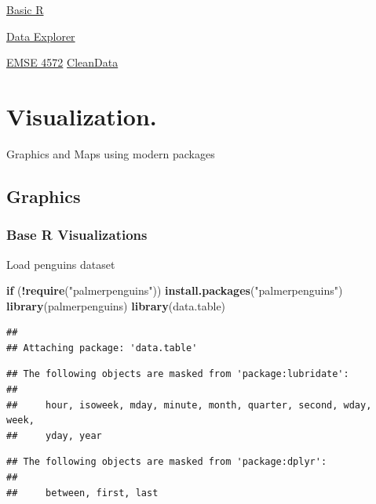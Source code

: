 \documentclass[
]{book}
\newenvironment{Shaded}{\begin{snugshade}}{\end{snugshade}}
\newcommand{\ControlFlowTok}[1]{\textcolor[rgb]{0.13,0.29,0.53}{\textbf{#1}}}
\newcommand{\FunctionTok}[1]{\textcolor[rgb]{0.13,0.29,0.53}{\textbf{#1}}}
\newcommand{\NormalTok}[1]{#1}
\newcommand{\SpecialCharTok}[1]{\textcolor[rgb]{0.81,0.36,0.00}{\textbf{#1}}}
\newcommand{\StringTok}[1]{\textcolor[rgb]{0.31,0.60,0.02}{#1}}
\begin{document}
\href{https://psyteachr.github.io/introdataviz/introduction.html}{Basic R}

\href{https://cran.r-project.org/web/packages/DataExplorer/vignettes/dataexplorer-intro.html}{Data Explorer}

\href{https://eda.seas.gwu.edu/2022-Fall/class/1-getting-started.html}{EMSE 4572}
\href{https://www.jumpingrivers.com/blog/best-practices-data-cleaning-r/}{CleanData}

\hypertarget{visualization.}{%
\chapter{Visualization.}\label{visualization.}}

Graphics and Maps using modern packages

\hypertarget{graphics}{%
\section{Graphics}\label{graphics}}

\hypertarget{base-r-visualizations}{%
\subsection{Base R Visualizations}\label{base-r-visualizations}}

Load penguins dataset

\begin{Shaded}
\begin{Highlighting}[]
\ControlFlowTok{if}\NormalTok{ (}\SpecialCharTok{!}\FunctionTok{require}\NormalTok{(}\StringTok{"palmerpenguins"}\NormalTok{)) }\FunctionTok{install.packages}\NormalTok{(}\StringTok{"palmerpenguins"}\NormalTok{)}
\FunctionTok{library}\NormalTok{(palmerpenguins)}
\FunctionTok{library}\NormalTok{(data.table)}
\end{Highlighting}
\end{Shaded}

\begin{verbatim}
## 
## Attaching package: 'data.table'
\end{verbatim}

\begin{verbatim}
## The following objects are masked from 'package:lubridate':
## 
##     hour, isoweek, mday, minute, month, quarter, second, wday, week,
##     yday, year
\end{verbatim}

\begin{verbatim}
## The following objects are masked from 'package:dplyr':
## 
##     between, first, last
\end{verbatim}
\end{document}
